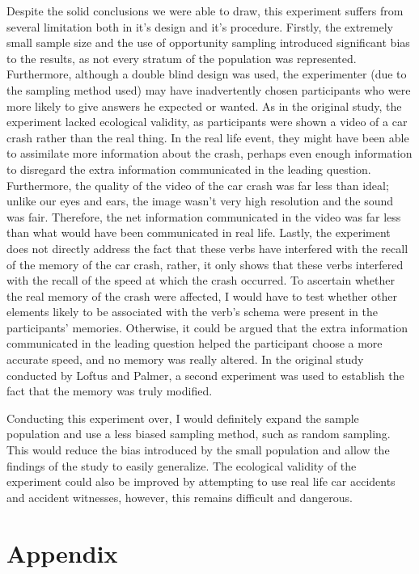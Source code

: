 \documentclass[a4paper,twocolumn]{report}
\begin{document}
Despite the solid conclusions we were able to draw, this experiment suffers
from several limitation both in it’s design and it’s procedure. Firstly,
the extremely small sample size and the use of opportunity sampling
introduced significant bias to the results, as not every stratum of the
population was represented. Furthermore, although a double blind design was
used, the experimenter (due to the sampling method used) may have
inadvertently chosen participants who were more likely to give answers he
expected or wanted. As in the original study, the experiment lacked
ecological validity, as participants were shown a video of a car crash
rather than the real thing. In the real life event, they might have been
able to assimilate more information about the crash, perhaps even enough
information to disregard the extra information communicated in the leading
question. Furthermore, the quality of the video of the car crash was far
less than ideal; unlike our eyes and ears, the image wasn’t very high
resolution and the sound was fair. Therefore, the net information
communicated in the video was far less than what would have been
communicated in real life. Lastly, the experiment does not directly
address the fact that these verbs have interfered with the recall of the
memory of the car crash, rather, it only shows that these verbs interfered
with the recall of the speed at which the crash occurred. To ascertain
whether the real memory of the crash were affected, I would have to test
whether other elements likely to be associated with the verb’s schema were
present in the participants’ memories. Otherwise, it could be argued that
the extra information communicated in the leading question helped the
participant choose a more accurate speed, and no memory was really altered.
In the original study conducted by Loftus and Palmer, a second experiment
was used to establish the fact that the memory was truly modified.

Conducting this experiment over, I would definitely expand the sample
population and use a less biased sampling method, such as random sampling.
This would reduce the bias introduced by the small population and allow the
findings of the study to easily generalize. The ecological validity of the
experiment could also be improved by attempting to use real life car
accidents and accident witnesses, however, this remains difficult and
dangerous.




\clearpage
\section{Appendix}
\end{document}
